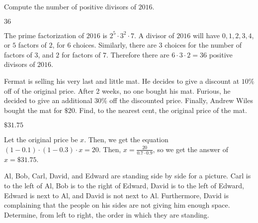 \documentclass[11pt]{article}
\begin{document}
\begin{problem}
Compute the number of positive divisors of $2016$.
\end{problem}

\begin{answer}
$\boxed{36}$
\end{answer}

\begin{solution}
The prime factorization of $2016$ is $2^5 \cdot 3^2 \cdot 7$. A divisor of $2016$ will have $0, 1, 2, 3, 4$, or $5$ factors of $2$, for $6$ choices. Similarly, there are $3$ choices for the number of factors of $3$, and $2$ for factors of $7$. Therefore there are $6 \cdot 3 \cdot 2 = \boxed{36}$ positive divisors of $2016$.
\end{solution}


\begin{problem} %
Fermat is selling his very last and little mat. He decides to give a discount at $10\%$ off of the original price. After 2 weeks, no one bought his mat. Furious, he decided to give an additional $30\%$ off the discounted price. Finally, Andrew Wiles bought the mat for $\$20$. Find, to the nearest cent, the original price of the mat.
\end{problem}

\begin{answer}
$\boxed{\$31.75}$
\end{answer}

\begin{solution}
Let the original price be $x$. Then, we get the equation $(1-0.1) \cdot (1-0.3) \cdot x = 20$. Then, $x = \frac{20}{0.7 \cdot 0.9}$, so we get the answer of $x = \boxed{\$31.75}$.
\end{solution}


\begin{problem}

Al, Bob, Carl, David, and Edward are standing side by side for a picture. Carl is to the left of Al, Bob is to the right of Edward, David is to the left of Edward, Edward is next to Al, and David is not next to Al. Furthermore, David is complaining that the people on his sides are not giving him enough space. Determine, from left to right, the order in which they are standing.
\end{problem}
\end{document}
